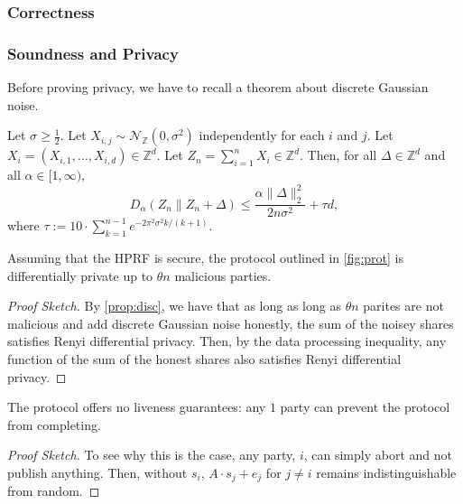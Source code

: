 \subsubsection*{Correctness}

\subsubsection*{Soundness and Privacy}

Before proving privacy, we have to recall a theorem about discrete Gaussian noise.


\begin{proposition}
	\label{prop:disc}
	Let $\sigma \geq \frac{1}{2}$.
	Let $X_{i,j} \sim \mathcal{N}_\mathbb{Z}(0, \sigma^2)$ independently for each $i$ and $j$.
	Let $X_i = (X_{i,1}, \dots, X_{i,d}) \in \mathbb{Z}^d$.
	Let $Z_n = \sum_{i=1}^n X_i \in \mathbb{Z}^d$. Then, for all $\Delta \in \mathbb{Z}^d$ and all $\alpha \in [1, \infty)$,
	\[
		D_\alpha(Z_n \parallel Z_n + \Delta) \leq \frac{\alpha \|\Delta\|_2^2}{2n\sigma^2} + \tau d,
	\]
	where $\tau := 10 \cdot \sum_{k=1}^{n-1} e^{-2\pi^2\sigma^2k/(k+1)}$.
\end{proposition}


\begin{theorem}
	Assuming that the HPRF is secure, the protocol outlined in \cref{fig:prot} is differentially private up to $\theta n$ malicious parties.
\end{theorem}
\begin{proof}[Proof Sketch]
	By \cref{prop:disc}, we have that as long as long as $\theta n$ parites are not malicious and add discrete Gaussian noise honestly, the sum of the noisey shares satisfies Renyi differential privacy.
	Then, by the data processing inequality, any function of the sum of the honest shares also satisfies Renyi differential privacy.
\end{proof}

\begin{theorem}[Liveness]
	The protocol offers no liveness guarantees: any $1$ party can prevent the protocol from completing.
\end{theorem}
\begin{proof}[Proof Sketch]
	To see why this is the case, any party, $i$, can simply abort and not publish anything.
	Then, without $s_i$, $A \cdot s_j + e_j$ for $j \neq i$ remains indistinguishable from random.
\end{proof}



